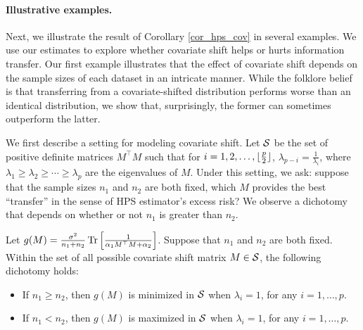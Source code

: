 \paragraph{Illustrative examples.} Next, we illustrate the result of Corollary \ref{cor_hps_cov} in several examples.
We use our estimates to explore whether covariate shift helps or hurts information transfer.
Our first example illustrates that the effect of covariate shift depends on the sample sizes of each dataset in an intricate manner.
    While the folklore belief is that transferring from a covariate-shifted distribution performs worse than an identical distribution, we show that, surprisingly, the former can sometimes outperform the latter.
    
    We first describe a setting for modeling covariate shift.
    Let $\mathcal{S}$ be the set of positive definite matrices $M^{\top} M$ such that for $i = 1,2,\dots,\lfloor {\frac p 2} \rfloor$, $\lambda_{p - i}  = \frac 1 {\lambda_i}$, where $\lambda_1 \ge \lambda_2 \ge \cdots \ge \lambda_p$ are the eigenvalues of $M$.
    Under this setting, we ask: suppose that the sample sizes $n_1$ and $n_2$ are both fixed, which $M$ provides the best ``transfer'' in the sense of HPS estimator's excess risk?
    We observe a dichotomy that depends on whether or not $n_1$ is greater than $n_2$.
    \begin{claim}\label{claim_dichotomy}
        Let $g(M) = \frac{\sigma^2}{n_1 + n_2} \operatorname{Tr}\left[\frac 1 {\alpha_1 M^{\top} M + \alpha_2}\right]$.
        Suppose that $n_1$ and $n_2$ are both fixed.
        Within the set of all possible covariate shift matrix $M\in\mathcal{S}$, the following dichotomy holds:
        \begin{itemize}
	        \item If $n_1 \ge n_2$, then $g(M)$ is minimized in $\mathcal{S}$ when $\lambda_i = 1$, for any $i = 1,\dots,p$.
	        \item If $n_1 < n_2$, then $g(M)$ is maximized in $\mathcal{S}$ when $\lambda_i = 1$, for any $i = 1,\dots,p$.
        \end{itemize}
    \end{claim}

